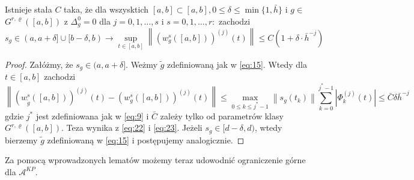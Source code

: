 \documentclass[oik, pdftex, robocza, man]{mgrwms}
\begin{document}
    \begin{lemma} \label{lem:3}
        Istnieje stała $C$ taka, że dla wszysktich $[a, b] \subset[a, b], 0 \leq \delta \leq \min \{1, \bar{h}\}$ i $g \in$ $G^{r, \varrho}([a, b])$ z $\Delta_{g}^{0}=0$ dla $j=0,1, \ldots, s$ i $s=0,1, \ldots, r:$ zachodzi
        \begin{equation*}
            s_{g} \in(a, a+\delta] \cup[b-\delta, b) \longrightarrow \sup _{t \in[a, b]}\left\|\left(w_{g}^{s}([a, b])\right)^{(j)}(t)\right\| \leq C\left(1+\delta \cdot \bar{h}^{-j}\right)
        \end{equation*}
    \end{lemma}
    \begin{proof}
        Załóżmy, że $s_{g} \in (a, a+\delta]$. Weżmy $\tilde{g}$ zdefiniowaną jak w \eqref{eq:15}. Wtedy dla $t \in[a, b]$ zachodzi
        \begin{equation} \label{eq:24}
            \left\|\left(w_{\tilde{g}}^{s}([a, b])\right)^{(j)}(t)-\left(w_{g}^{s}([a, b])\right)^{(j)}(t)\right\| \leq \max _{0 \leq k \leq j^{*}-1}\left\|s_{g}\left(t_{k}\right)\right\| \sum_{k=0}^{j^{*}-1}\left|\Phi_{k}^{(j)}(t)\right| \leq \bar{C} \delta \bar{h}^{-j}
        \end{equation}
        gdzie $j^{*}$ jest zdefiniowana jak w \eqref{eq:9} i $\bar{C}$  zależy tylko od parametrów klasy $G^{r, \varrho}([a, b])$. Teza wynika z \eqref{eq:22} i \eqref{eq:23}. Jeżeli $s_{g} \in[d-\delta, d)$, wtedy bierzemy $\tilde{g}$ zdefiniowaną w \eqref{eq:15} i postępujemy analogicznie.
    \end{proof}

    Za pomocą wprowadzonych lematów możemy teraz udowodnić ograniczenie górne dla $\mathcal{A}^{KP}$.
\end{document}
